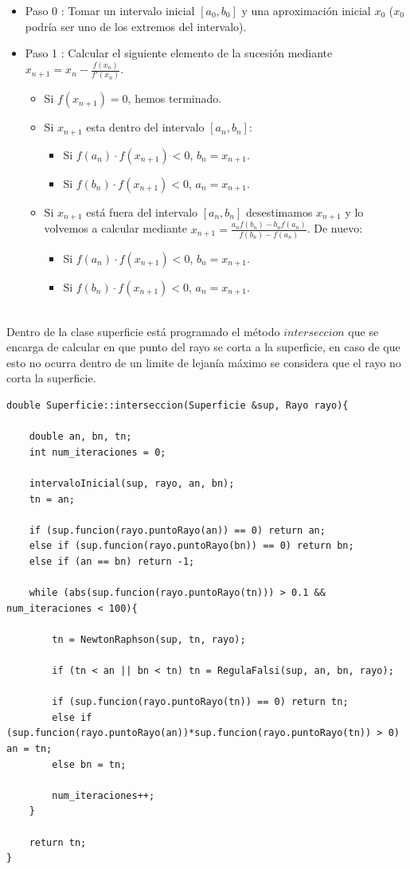 \begin{itemize}
	\item Paso 0 : Tomar un intervalo inicial $[a_0, b_0]$ y una aproximación inicial $x_0$ ($x_0$ podría ser uno de los extremos del intervalo).
	\item Paso 1 : Calcular el siguiente elemento de la sucesión mediante $x_{n+1} = x_n - \frac{f(x_n)}{f'(x_n)}$.
	\begin{itemize}
		\item Si $f(x_{n+1}) = 0$, hemos terminado.
		\item Si $x_{n+1}$ esta dentro del intervalo $[a_n, b_n]$:
		\begin{itemize}
			\item Si $f(a_n) \cdot f(x_{n+1}) < 0$, $b_n = x_{n+1}$.
			\item Si $f(b_n) \cdot f(x_{n+1}) < 0$, $a_n = x_{n+1}$.
		\end{itemize}
		\item Si $x_{n+1}$ está fuera del intervalo $[a_n, b_n]$ desestimamos $x_{n+1}$ y lo volvemos a calcular mediante $x_{n+1} = \frac{a_n f(b_n) - b_n f(a_n)}{f(b_n) - f(a_n)}$. De nuevo:
		\begin{itemize}
			\item Si $f(a_n) \cdot f(x_{n+1}) < 0$, $b_n = x_{n+1}$.
			\item Si $f(b_n) \cdot f(x_{n+1}) < 0$, $a_n = x_{n+1}$.
		\end{itemize}
	\end{itemize}
\end{itemize}
${ }$\\


Dentro de la clase superficie está programado el método $interseccion$ que se encarga de calcular en que punto del rayo se corta a la superficie, en caso de que esto no ocurra dentro de un limite de lejanía máximo se considera que el rayo no corta la superficie.
${ }$\\

\begin{lstlisting}[style=Consola]
double Superficie::interseccion(Superficie &sup, Rayo rayo){

	double an, bn, tn;
	int num_iteraciones = 0;

	intervaloInicial(sup, rayo, an, bn);
	tn = an;

	if (sup.funcion(rayo.puntoRayo(an)) == 0) return an;
	else if (sup.funcion(rayo.puntoRayo(bn)) == 0) return bn;
	else if (an == bn) return -1;

	while (abs(sup.funcion(rayo.puntoRayo(tn))) > 0.1 && num_iteraciones < 100){

		tn = NewtonRaphson(sup, tn, rayo);

		if (tn < an || bn < tn) tn = RegulaFalsi(sup, an, bn, rayo);

		if (sup.funcion(rayo.puntoRayo(tn)) == 0) return tn;
		else if (sup.funcion(rayo.puntoRayo(an))*sup.funcion(rayo.puntoRayo(tn)) > 0) an = tn;
		else bn = tn;

		num_iteraciones++;
	}

	return tn;
}
\end{lstlisting}
${ }$\\

